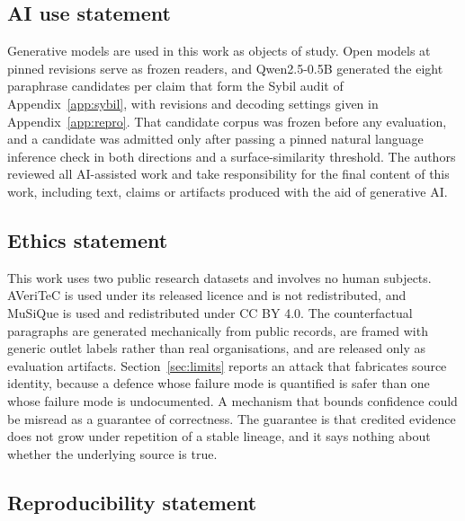 \documentclass{article}
\begin{document}
\label{endofmain}

\subsection*{AI use statement}

Generative models are used in this work as objects of study. Open models at
pinned revisions serve as frozen readers, and Qwen2.5-0.5B generated the eight
paraphrase candidates per claim that form the Sybil audit of
Appendix~\ref{app:sybil}, with revisions and decoding settings given in
Appendix~\ref{app:repro}. That candidate corpus was frozen before any
evaluation, and a candidate was admitted only after passing a pinned natural
language inference check in both directions and a surface-similarity threshold.
The authors reviewed all AI-assisted work and take responsibility for the final
content of this work, including text, claims or artifacts produced with the aid
of generative AI.

\subsection*{Ethics statement}

This work uses two public research datasets and involves no human subjects.
AVeriTeC is used under its released licence and is not redistributed, and
MuSiQue is used and redistributed under CC BY 4.0. The counterfactual paragraphs
are generated mechanically from public records, are framed with generic outlet
labels rather than real organisations, and are released only as evaluation
artifacts. Section~\ref{sec:limits} reports an attack that fabricates source
identity, because a defence whose failure mode is quantified is safer than one
whose failure mode is undocumented. A mechanism that bounds confidence could be
misread as a guarantee of correctness. The guarantee is that credited evidence
does not grow under repetition of a stable lineage, and it says nothing about
whether the underlying source is true.

\subsection*{Reproducibility statement}
\end{document}
